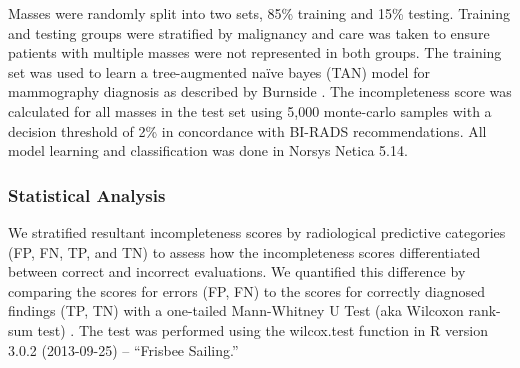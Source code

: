 Masses were randomly split into two sets, 85\% training and 15\% testing. Training and testing groups were stratified by malignancy and care was taken to ensure patients with multiple masses were not represented in both groups. The training set was used to learn a tree-augmented na\"{i}ve bayes (TAN) model for mammography diagnosis as described by Burnside \cite{Burnside:2009br, Friedman:1997gw}. The incompleteness score was calculated for all masses in the test set using 5,000 monte-carlo samples with a decision threshold of 2\% in concordance with BI-RADS recommendations. All model learning and classification was done in Norsys Netica 5.14.

\subsubsection{Statistical Analysis}
We stratified resultant incompleteness scores by radiological predictive categories (FP, FN, TP, and TN) to assess how the incompleteness scores differentiated between correct and incorrect evaluations. We quantified this difference by comparing the scores for errors (FP, FN) to the scores for correctly diagnosed findings (TP, TN) with a one-tailed Mann-Whitney U Test (aka Wilcoxon rank-sum test) \cite{Wilcoxon:1945tm}. The test was performed using the wilcox.test function in R version 3.0.2 (2013-09-25) -- ``Frisbee Sailing.''
